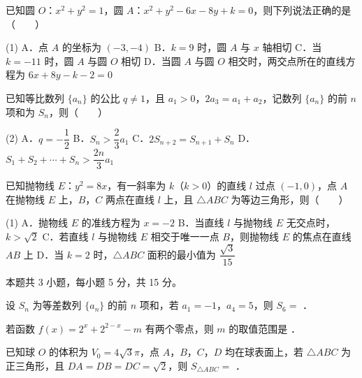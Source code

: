 \begin{question}
已知圆 $O$：$x^2+y^2=1$，圆 $A$：$x^2+y^2-6x-8y+k=0$，则下列说法正确的是\mbox{（　　）}

\begin{gkopts}(1)
\task A．点 $A$ 的坐标为 $(-3,-4)$
\task B．$k=9$ 时，圆 $A$ 与 $x$ 轴相切
\task C．当 $k=-11$ 时，圆 $A$ 与圆 $O$ 相切
\task D．当圆 $A$ 与圆 $O$ 相交时，两交点所在的直线方程为 $6x+8y-k-2=0$
\end{gkopts}

\end{question}
\begin{question}
已知等比数列 $\{a_n\}$ 的公比 $q\ne1$，且 $a_1>0$，$2a_3=a_1+a_2$，记数列 $\{a_n\}$ 的前 $n$ 项和为 $S_n$，则\mbox{（　　）}

\begin{gkopts}(2)
\task A．$q=-\dfrac{1}{2}$
\task B．$S_n>\dfrac{2}{3}a_1$
\task C．$2S_{n+2}=S_{n+1}+S_n$
\task D．$S_1+S_2+\cdots+S_n>\dfrac{2n}{3}a_1$
\end{gkopts}

\end{question}
\begin{question}
已知抛物线 $E$：$y^2=8x$，有一斜率为 $k$（$k>0$）的直线 $l$ 过点 $(-1,0)$，点 $A$ 在抛物线 $E$ 上，$B$，$C$ 两点在直线 $l$ 上，且 $\triangle ABC$ 为等边三角形，则\mbox{（　　）}

\begin{gkopts}(1)
\task A．抛物线 $E$ 的准线方程为 $x=-2$
\task B．当直线 $l$ 与抛物线 $E$ 无交点时，$k>\sqrt{2}$
\task C．若直线 $l$ 与抛物线 $E$ 相交于唯一一点 $B$，则抛物线 $E$ 的焦点在直线 $AB$ 上
\task D．当 $k=2$ 时，$\triangle ABC$ 面积的最小值为 $\dfrac{\sqrt{3}}{15}$
\end{gkopts}

\par\medskip

\end{question}

\begin{gktip}
本题共 3 小题，每小题 5 分，共 15 分。
\end{gktip}

\begin{question}
设 $S_n$ 为等差数列 $\{a_n\}$ 的前 $n$ 项和，若 $a_1=-1$，$a_4=5$，则 $S_6=$ \gkblank{}．

\end{question}
\begin{question}
若函数 $f(x)=2^x+2^{2-x}-m$ 有两个零点，则 $m$ 的取值范围是 \gkblank{}．

\end{question}
\begin{question}
已知球 $O$ 的体积为 $V_0=4\sqrt{3}\pi$，点 $A$，$B$，$C$，$D$ 均在球表面上，若 $\triangle ABC$ 为正三角形，且 $DA=DB=DC=\sqrt{2}$，则 $S_{\triangle ABC}=$ \gkblank{}．

\par\medskip

\end{question}

